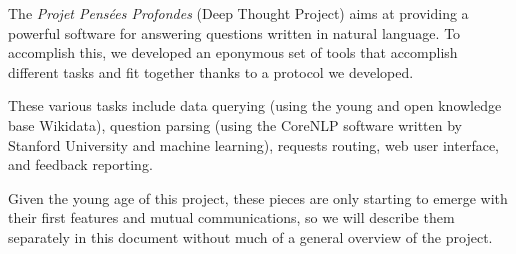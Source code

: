 The {\em Projet Pensées Profondes} (Deep Thought Project) aims at
providing a powerful software for answering questions written in
natural language.
To accomplish this, we developed an eponymous set of tools that
accomplish different tasks and fit together thanks to a protocol
we developed.

These various tasks include data querying (using the young and open
knowledge base Wikidata), question parsing (using the
CoreNLP software written by Stanford University and machine learning),
requests routing, web user interface, and feedback reporting.

Given the young age of this project, these pieces are only starting
to emerge with their first features and mutual communications,
so we will describe them separately in this document without
much of a general overview of the project.
